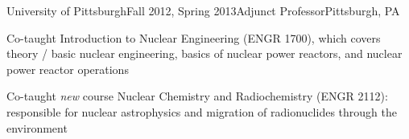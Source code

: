 
\begin{rSubsection}{University of Pittsburgh}{Fall 2012, Spring 2013}{Adjunct Professor}{Pittsburgh, PA}
\item Co-taught Introduction to Nuclear Engineering (ENGR 1700), which covers theory / basic nuclear engineering, basics of nuclear power reactors, and nuclear power reactor operations
\item Co-taught \textit{new} course Nuclear Chemistry and Radiochemistry (ENGR 2112): responsible for nuclear astrophysics and migration of radionuclides through the environment
\end{rSubsection}



%
